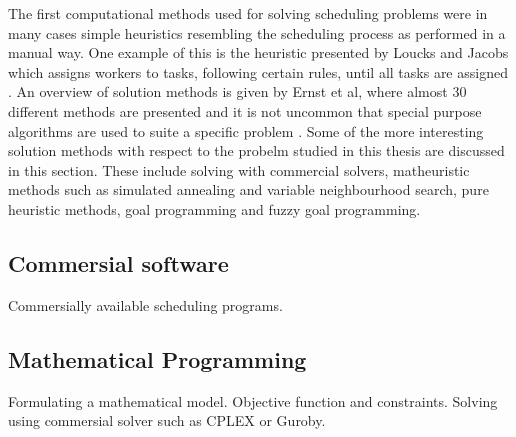 The first computational methods used for solving scheduling problems were in many cases simple heuristics resembling the scheduling process as performed in a manual way. One example of this is the heuristic presented by Loucks and Jacobs which assigns workers to tasks, following certain rules, until all tasks are assigned \citet{loucks_1991}. An overview of solution methods is given by Ernst et al, where almost 30 different methods are presented  and it is not uncommon that special purpose algorithms are used to suite a specific problem \citet{ernst_2004}. Some of the more interesting solution methods with respect to the probelm studied in this thesis are discussed in this section. These include solving with commercial solvers, matheuristic methods such as simulated annealing and variable neighbourhood search, pure heuristic methods, goal programming and fuzzy goal programming.  



\subsection{Commersial software}

Commersially available scheduling programs.

\subsection{Mathematical Programming}

Formulating a mathematical model. Objective function and constraints. Solving using commersial solver such as CPLEX or Guroby.




\ %


